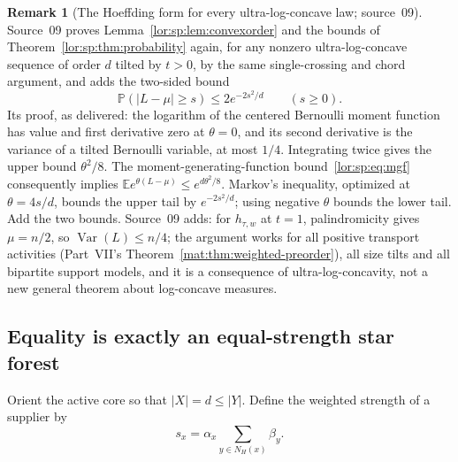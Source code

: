 \documentclass[11pt]{article}
\numberwithin{equation}{section}
\theoremstyle{definition}
\newtheorem{remark}[theorem]{Remark}
\newcommand{\Var}{\operatorname{Var}}
\newcommand{\EE}{\mathbb E}
\newcommand{\PP}{\mathbb P}
\begin{document}
\begin{remark}[The Hoeffding form for every ultra-log-concave law; source~09]
\label{lor:rem:hoeffding}
Source~09 proves Lemma~\ref{lor:sp:lem:convexorder} and the bounds of
Theorem~\ref{lor:sp:thm:probability} again, for any nonzero ultra-log-concave
sequence of order $d$ tilted by $t>0$, by the same single-crossing and
chord argument, and adds the two-sided bound
\[
 \PP(|L-\mu|\ge s)\le2e^{-2s^2/d}\qquad(s\ge0).
\]
Its proof, as delivered: the logarithm of the centered Bernoulli moment
function has value and first derivative zero at $\theta=0$, and its second
derivative is the variance of a tilted Bernoulli variable, at most $1/4$.
Integrating twice gives the upper bound $\theta^2/8$. The
moment-generating-function bound~\eqref{lor:sp:eq:mgf} consequently implies
$\EE e^{\theta(L-\mu)}\le e^{d\theta^2/8}$. Markov's inequality, optimized
at $\theta=4s/d$, bounds the upper tail by $e^{-2s^2/d}$; using negative
$\theta$ bounds the lower tail. Add the two bounds. Source~09 adds: for
$h_{\tau,w}$ at $t=1$, palindromicity gives $\mu=n/2$, so
$\Var(L)\le n/4$; the argument works for all positive transport activities
(Part~VII's Theorem~\ref{mat:thm:weighted-preorder}), all size tilts and all
bipartite support models, and it is a consequence of ultra-log-concavity,
not a new general theorem about log-concave measures.
\end{remark}

\subsection{Equality is exactly an equal-strength star forest}
Orient the active core so that $|X|=d\le|Y|$. Define the weighted strength
of a supplier by
\[
 s_x=\alpha_x\sum_{y\in N_H(x)}\beta_y.
\]
\end{document}

